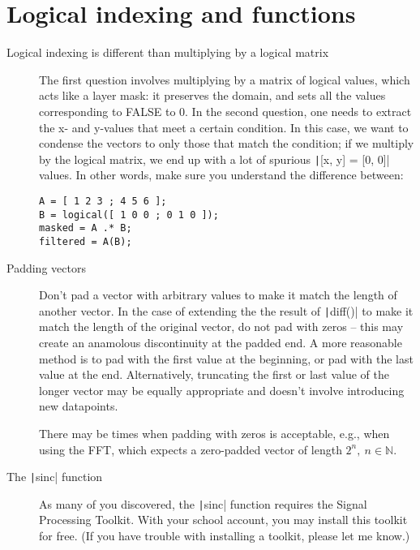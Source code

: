 \documentclass{article}
\begin{document}
\clearpage{}
\section{Logical indexing and functions}
\begin{description}
\item[Logical indexing is different than multiplying by a logical matrix] The first question involves multiplying by a matrix of logical values, which acts like a layer mask: it preserves the domain, and sets all the values corresponding to FALSE to 0. In the second question, one needs to extract the x- and y-values that meet a certain condition. In this case, we want to condense the vectors to only those that match the condition; if we multiply by the logical matrix, we end up with a lot of spurious \texttt|[x, y] = [0, 0]| values. In other words, make sure you understand the difference between:
\begin{verbatim}
A = [ 1 2 3 ; 4 5 6 ];
B = logical([ 1 0 0 ; 0 1 0 ]);
masked = A .* B;
filtered = A(B);
\end{verbatim}

\item[Padding vectors] Don't pad a vector with arbitrary values to make it match the length of another vector. In the case of extending the the result of \texttt|diff()| to make it match the length of the original vector, do not pad with zeros -- this may create an anamolous discontinuity at the padded end. A more reasonable method is to pad with the first value at the beginning, or pad with the last value at the end. Alternatively, truncating the first or last value of the longer vector may be equally appropriate and doesn't involve introducing new datapoints.

  There may be times when padding with zeros is acceptable, e.g., when using the FFT, which expects a zero-padded vector of length $2^n,\ n\in\mathbb{N}$.

\item[The \texttt|sinc| function] As many of you discovered, the \texttt|sinc| function requires the Signal Processing Toolkit. With your school account, you may install this toolkit for free. (If you have trouble with installing a toolkit, please let me know.)


\end{description}
\end{document}
